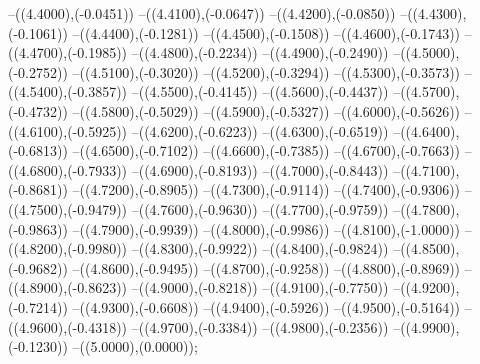{	--({\sx*(4.4000)},{\sy*(-0.0451)})
	--({\sx*(4.4100)},{\sy*(-0.0647)})
	--({\sx*(4.4200)},{\sy*(-0.0850)})
	--({\sx*(4.4300)},{\sy*(-0.1061)})
	--({\sx*(4.4400)},{\sy*(-0.1281)})
	--({\sx*(4.4500)},{\sy*(-0.1508)})
	--({\sx*(4.4600)},{\sy*(-0.1743)})
	--({\sx*(4.4700)},{\sy*(-0.1985)})
	--({\sx*(4.4800)},{\sy*(-0.2234)})
	--({\sx*(4.4900)},{\sy*(-0.2490)})
	--({\sx*(4.5000)},{\sy*(-0.2752)})
	--({\sx*(4.5100)},{\sy*(-0.3020)})
	--({\sx*(4.5200)},{\sy*(-0.3294)})
	--({\sx*(4.5300)},{\sy*(-0.3573)})
	--({\sx*(4.5400)},{\sy*(-0.3857)})
	--({\sx*(4.5500)},{\sy*(-0.4145)})
	--({\sx*(4.5600)},{\sy*(-0.4437)})
	--({\sx*(4.5700)},{\sy*(-0.4732)})
	--({\sx*(4.5800)},{\sy*(-0.5029)})
	--({\sx*(4.5900)},{\sy*(-0.5327)})
	--({\sx*(4.6000)},{\sy*(-0.5626)})
	--({\sx*(4.6100)},{\sy*(-0.5925)})
	--({\sx*(4.6200)},{\sy*(-0.6223)})
	--({\sx*(4.6300)},{\sy*(-0.6519)})
	--({\sx*(4.6400)},{\sy*(-0.6813)})
	--({\sx*(4.6500)},{\sy*(-0.7102)})
	--({\sx*(4.6600)},{\sy*(-0.7385)})
	--({\sx*(4.6700)},{\sy*(-0.7663)})
	--({\sx*(4.6800)},{\sy*(-0.7933)})
	--({\sx*(4.6900)},{\sy*(-0.8193)})
	--({\sx*(4.7000)},{\sy*(-0.8443)})
	--({\sx*(4.7100)},{\sy*(-0.8681)})
	--({\sx*(4.7200)},{\sy*(-0.8905)})
	--({\sx*(4.7300)},{\sy*(-0.9114)})
	--({\sx*(4.7400)},{\sy*(-0.9306)})
	--({\sx*(4.7500)},{\sy*(-0.9479)})
	--({\sx*(4.7600)},{\sy*(-0.9630)})
	--({\sx*(4.7700)},{\sy*(-0.9759)})
	--({\sx*(4.7800)},{\sy*(-0.9863)})
	--({\sx*(4.7900)},{\sy*(-0.9939)})
	--({\sx*(4.8000)},{\sy*(-0.9986)})
	--({\sx*(4.8100)},{\sy*(-1.0000)})
	--({\sx*(4.8200)},{\sy*(-0.9980)})
	--({\sx*(4.8300)},{\sy*(-0.9922)})
	--({\sx*(4.8400)},{\sy*(-0.9824)})
	--({\sx*(4.8500)},{\sy*(-0.9682)})
	--({\sx*(4.8600)},{\sy*(-0.9495)})
	--({\sx*(4.8700)},{\sy*(-0.9258)})
	--({\sx*(4.8800)},{\sy*(-0.8969)})
	--({\sx*(4.8900)},{\sy*(-0.8623)})
	--({\sx*(4.9000)},{\sy*(-0.8218)})
	--({\sx*(4.9100)},{\sy*(-0.7750)})
	--({\sx*(4.9200)},{\sy*(-0.7214)})
	--({\sx*(4.9300)},{\sy*(-0.6608)})
	--({\sx*(4.9400)},{\sy*(-0.5926)})
	--({\sx*(4.9500)},{\sy*(-0.5164)})
	--({\sx*(4.9600)},{\sy*(-0.4318)})
	--({\sx*(4.9700)},{\sy*(-0.3384)})
	--({\sx*(4.9800)},{\sy*(-0.2356)})
	--({\sx*(4.9900)},{\sy*(-0.1230)})
	--({\sx*(5.0000)},{\sy*(0.0000)});
}
